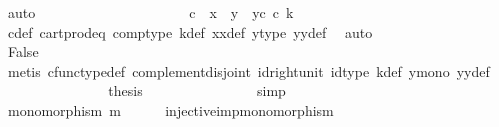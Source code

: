 \begin{isabellebody}
\ auto\ \ \ \ \ \ \isanewline
\ \ \ \ \ \ \ \ \ \ \ \ \isamarkupfalse%
\ \isamarkupfalse%
\ {\isachardoublequoteopen}{\isacharparenleft}{\kern0pt}c\ {\isacharequal}{\kern0pt}\ x{}{\isacharparenright}{\kern0pt}\ {\isasymand}\ {\isacharparenleft}{\kern0pt}y{}\ {\isacharequal}{\kern0pt}\ y{}\isactrlsup c\ {\isasymcirc}\isactrlsub c\ k{\isacharparenright}{\kern0pt}{\isachardoublequoteclose}\isanewline
\ \ \ \ \ \ \ \ \ \ \ \ \ \ \isamarkupfalse%
\ c{\isacharunderscore}{\kern0pt}def\ cart{\isacharunderscore}{\kern0pt}prod{\isacharunderscore}{\kern0pt}eq{}\ comp{\isacharunderscore}{\kern0pt}type\ k{\isacharunderscore}{\kern0pt}def\ x{}x{}{\isacharunderscore}{\kern0pt}def{\isacharparenleft}{\kern0pt}{}{\isacharparenright}{\kern0pt}\ y{}{\isacharprime}{\kern0pt}{\isacharunderscore}{\kern0pt}type\ y{}y{}{\isacharunderscore}{\kern0pt}def{\isacharparenleft}{\kern0pt}{}{\isacharparenright}{\kern0pt}\ \isamarkupfalse%
\ auto\ \isanewline
\ \ \ \ \ \ \ \ \ \ \ \ \isamarkupfalse%
\ \isamarkupfalse%
\ False\isanewline
\ \ \ \ \ \ \ \ \ \ \ \ \ \ \isamarkupfalse%
\ {\isacharparenleft}{\kern0pt}metis\ cfunc{\isacharunderscore}{\kern0pt}type{\isacharunderscore}{\kern0pt}def\ complement{\isacharunderscore}{\kern0pt}disjoint\ id{\isacharunderscore}{\kern0pt}right{\isacharunderscore}{\kern0pt}unit\ id{\isacharunderscore}{\kern0pt}type\ k{\isacharunderscore}{\kern0pt}def\ y{}{\isacharunderscore}{\kern0pt}mono\ y{}y{}{\isacharunderscore}{\kern0pt}def{\isacharparenleft}{\kern0pt}{}{\isacharparenright}{\kern0pt}{\isacharparenright}{\kern0pt}\isanewline
\ \ \ \ \ \ \ \ \ \ \ \ \isamarkupfalse%
\ \isamarkupfalse%
\ {\isacharquery}{\kern0pt}thesis\isanewline
\ \ \ \ \ \ \ \ \ \ \ \ \ \ \isamarkupfalse%
\ simp\isanewline
\ \ \ \ \ \ \ \ \isamarkupfalse%
\isanewline
\ \ \ \ \ \ \isamarkupfalse%
\isanewline
\ \ \ \ \isamarkupfalse%
\isanewline
\ \ \isamarkupfalse%
\isanewline
\ \ \isamarkupfalse%
\ \isamarkupfalse%
\ {\isachardoublequoteopen}monomorphism\ m{\isachardoublequoteclose}\isanewline
\ \ \ \ \isamarkupfalse%
\ injective{\isacharunderscore}{\kern0pt}imp{\isacharunderscore}{\kern0pt}monomorphism\ \isamarkupfalse%

\end{isabellebody}
